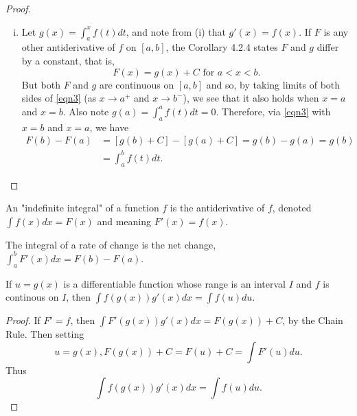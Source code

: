 \documentclass[a4paper,8pt]{article}
\begin{document}
\begin{outline}
\begin{proof}
\begin{enumerate}[i.]
          A similar proof of equation \eqref{eqn2} holds for \(h < 0\). Now let \(h\rightarrow 0\) which means
          \(u\rightarrow x\) and \(v\rightarrow x\) since \(u, v\in [x, x+h]\). Therefore \(\xlimit{h}{0}f(u) =
          \xlimit{u}{x}f(u)=f(x)\) and \(\xlimit{h}{0}f(v)=\xlimit{v}{x}f(v)=f(x)\). Then by equation \eqref{eqn2}
          and the Squeeze Theorem, \(g'(x) = \xlimit{h}{0}\frac{g(x+h)-g(x)}{h} = f(x)\). If \(x=a\) or \(x=b\),
          we consider \(g'(x)\) as a one sided-limit. Regardless, because \(g\) is differentiable, then \(g\) is
          continous on \([a,b]\).
        \item
          Let \(g(x)=\int_a^xf(t)dt\), and note from (i) that \(g'(x) = f(x)\). If \(F\) is any other
          antiderivative of \(f\) on \([a, b]\), the Corollary 4.2.4 states \(F\) and \(g\) differ by a constant,
          that is,
          \begin{equation}
            \label{eqn3}
            F(x) = g(x) + C\text{ for }a < x < b\text{.}
          \end{equation}
          But both \(F\) and \(g\) are continuous on \([a, b]\) and so, by taking limits of both sides of
          \eqref{eqn3} (as \(x\rightarrow a^{+}\) and \(x\rightarrow b^{-}\)), we see that it also holds when
          \(x = a\) and \(x = b\). Also note \(g(a) = \int_a^a f(t)dt = 0\). Therefore, via \eqref{eqn3}
          with \(x=b\) and \(x=a\), we have
          \begin{align*}
            F(b)-F(a) &= [g(b) + C] - [g(a) + C] = g(b)-g(a) = g(b)\\
                      &= \int_a^bf(t)dt\text{.}
          \end{align*}
      \end{enumerate}
    \end{proof}

    An "indefinite integral" of a function \(f\) is the antiderivative of \(f\), denoted \(\int f(x)dx=F(x)\)
    and meaning \(F'(x)=f(x)\).

    The integral of a rate of change is the net change, \(\int_a^bF'(x)dx = F(b)-F(a)\).

    If \(u=g(x)\) is a differentiable function whose range is an interval \(I\) and \(f\) is continous
    on \(I\), then \(\int f(g(x))g'(x)dx = \int f(u)du\).

    \begin{proof}
      If \(F'=f\), then \(\int F'(g(x))g'(x)dx = F(g(x)) + C\), by the Chain Rule. Then setting
      \[ u = g(x), F(g(x)) + C = F(u) + C = \int F'(u)du\text{.} \] Thus
      \[ \int f(g(x))g'(x)dx = \int f(u)du\text{.} \]
    \end{proof}


\end{outline}
\end{document}
